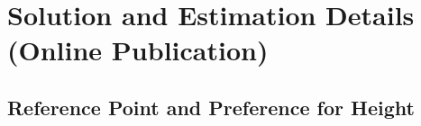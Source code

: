 
\renewcommand{\thefigure}{A.\arabic{figure}}
\setcounter{figure}{0}
\renewcommand{\thetable}{A.\arabic{table}}
\setcounter{table}{0}
\renewcommand{\theequation}{A.\arabic{equation}}
\setcounter{equation}{0}
\renewcommand{\thefootnote}{A.\arabic{footnote}}
\setcounter{footnote}{0}

\section{Solution and Estimation Details (Online Publication)}

\subsection{Reference Point and Preference for Height \label{sec:apprefsd}}


